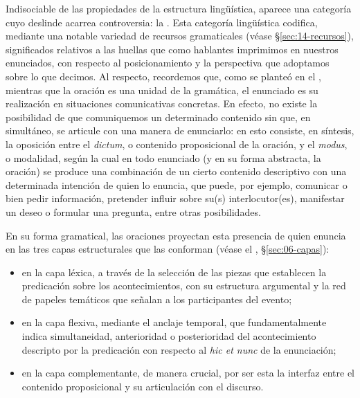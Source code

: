 Indisociable de las propiedades de la estructura lingüística, aparece una
categoría cuyo deslinde acarrea controversia: la . Esta
categoría lingüística codifica, mediante una notable variedad de recursos
gramaticales (véase §\ref{sec:14-recursos}), significados relativos a las
huellas que como hablantes imprimimos en nuestros enunciados, con respecto al
posicionamiento y la perspectiva que adoptamos sobre lo que decimos. Al
respecto, recordemos que, como se planteó en el , mientras que la
oración es una unidad de la gramática, el enunciado es su realización en
situaciones comunicativas concretas. En efecto, no existe la posibilidad de que
comuniquemos un determinado contenido sin que, en simultáneo, se articule con
una manera de enunciarlo: en esto consiste, en síntesis, la oposición entre el
\textit{dictum}, o contenido proposicional de la oración, y el \textit{modus}, o
modalidad, según la cual en todo enunciado (y en su forma abstracta, la oración)
se produce una combinación de un cierto contenido descriptivo con una
determinada intención de quien lo enuncia, que puede, por ejemplo, comunicar o
bien pedir información, pretender influir sobre su(s) interlocutor(es),
manifestar un deseo o formular una pregunta, entre otras
posibilidades.

En su forma gramatical, las oraciones proyectan esta presencia de quien enuncia
en las tres capas estructurales que las conforman (véase el ,
§\ref{sec:06-capas}):

\begin{itemize}
  \item en la capa léxica, a través de la selección de las piezas que establecen
        la predicación sobre los acontecimientos, con su estructura argumental y
        la red de papeles temáticos que señalan a los participantes del evento;
  \item en la capa flexiva, mediante el anclaje temporal, que fundamentalmente
        indica simultaneidad, anterioridad o posterioridad del acontecimiento
        descripto por la predicación con respecto al \textit{hic et nunc} de la
        enunciación;
  \item en la capa complementante, de manera crucial, por ser esta la interfaz
        entre el contenido proposicional y su articulación con el discurso.
\end{itemize}

